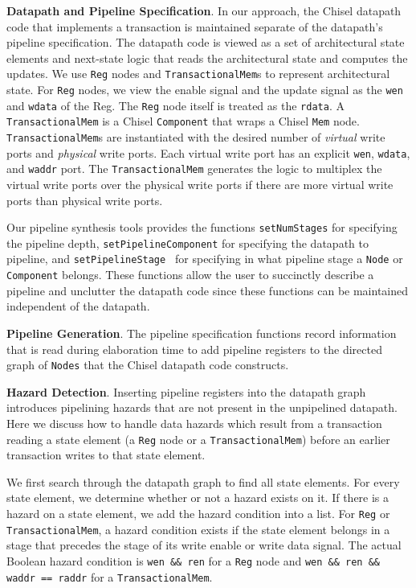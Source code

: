 {\bf Datapath and Pipeline Specification}. In our approach, the Chisel
datapath code that implements a transaction is maintained separate of
the datapath's pipeline specification. The datapath code is viewed as
a set of architectural state elements and next-state logic that reads
the architectural state and computes the updates. We use {\tt Reg}
nodes and {\tt TransactionalMem}s to represent architectural
state. For {\tt Reg} nodes, we view the enable signal and the
update signal as the {\tt wen} and {\tt wdata} of the Reg. The {\tt Reg}
node itself is treated as the {\tt rdata}. A {\tt TransactionalMem} is
a Chisel {\tt Component} that wraps a Chisel {\tt Mem} node. 
{\tt TransactionalMem}s are instantiated with the desired number of
{\it virtual} write ports and {\it physical} write ports. Each
virtual write port has an explicit {\tt wen}, {\tt wdata}, and {\tt waddr}
port. The {\tt TransactionalMem} generates the logic to multiplex the
virtual write ports over the physical write ports if there are more
virtual write ports than physical write ports.

Our pipeline synthesis tools provides the functions
{\tt setNumStages} for specifying the pipeline depth, 
{\tt setPipelineComponent} for specifying the datapath to pipeline,
and {\tt setPipelineStage } for specifying in what pipeline stage a {\tt Node}
or {\tt Component} belongs. These functions allow the user to
succinctly describe a pipeline and unclutter the datapath code since
these functions can be maintained independent of the datapath.

{\bf Pipeline Generation}. The pipeline specification functions record
information that is read during elaboration time to add pipeline
registers to the directed graph of {\tt Nodes} that the Chisel datapath
code constructs.

{\bf Hazard Detection}. Inserting pipeline registers into the datapath
graph introduces pipelining hazards that are not present in the
unpipelined datapath. Here we discuss how to handle data hazards which
result from a transaction reading a state element (a {\tt Reg} node or a
{\tt TransactionalMem}) before an earlier transaction writes to that state
element. 

We first search through the datapath graph to find all state
elements. For every state element, we determine whether or not a
hazard exists on it. If there is a hazard on a state element, we add
the hazard condition into a list. For {\tt Reg} or {\tt TransactionalMem}, a
hazard condition exists if the state element belongs in a stage that precedes the
stage of its write enable or write data signal. The actual Boolean
hazard condition is {\tt wen \&\& ren} for a {\tt Reg} node and
{\tt wen \&\& ren \&\& waddr == raddr} for a {\tt TransactionalMem}.

